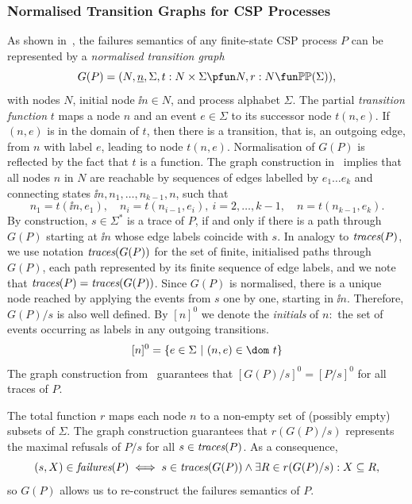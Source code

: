 \subsubsection*{Normalised Transition Graphs for CSP Processes}
\label{sec:ntg}

As shown in~\cite{Roscoe:1994:CME:197600}, the failures semantics of 
any finite-state CSP process $P$
can be represented by a \emph{normalised transition graph}
$$
G(P) = ( N, \ii n, \Sigma, t : N\times\Sigma \pfun N, r : N \fun \mathbb{P}\mathbb{P}(\Sigma)),
$$
with nodes $N$, initial node $\ii n\in N$, and process alphabet $\Sigma$. The
partial \emph{transition function} $t$ maps a node $n$ and an event
$e\in\Sigma$ to its successor node $t(n,e)$. If $(n,e)$ is in the domain of
$t$, then there is a transition, that is, an outgoing edge, from $n$ with label $e$, leading to node $t(n,e)$. Normalisation of
$G(P)$ is reflected by the fact that $t$ is a function. The graph construction
in~\cite{Roscoe:1994:CME:197600} implies that all nodes $n$ in $N$ are reachable by
sequences of edges labelled by $e_1\dots e_k$ and connecting states
$\ii n,n_1,\dots,n_{k-1},n$, such that
\[
n_1 = t(\ii n,e_1), \quad n_i = t(n_{i-1},e_i),\ i = 2,\dots,k-1,\quad
n= t(n_{k-1},e_k).
\]
%
By construction, $s\in\Sigma^*$ is a trace of $P$, if and only if 
there is a path through $G(P)$ starting  at $\ii n$ whose edge labels
coincide with $s$. In analogy to $\text{\it traces}(P)$, we use
notation $\text{\it traces}(G(P))$ for the set of finite, initialised paths
through $G(P)$, each path represented by its finite sequence of edge labels, and we
note that $\text{\it traces}(P) = \text{\it traces}(G(P))$. 
Since $G(P)$ is normalised, there is a unique node
reached by applying the events from $s$ one by one, starting in $\ii n$.
Therefore, $G(P)/s$  is also well defined. By $[n]^0$ we denote the
\emph{initials} of $n$:~the set of events occurring as labels in any outgoing
transitions.
$$
[n]^0 = \{ e\in\Sigma~|~(n,e)\in\dom~t \}
$$
The graph construction from~\cite{Roscoe:1994:CME:197600} guarantees that
$[G(P)/s]^0 = [P/s]^0$ for all traces of $P$.

 

The total function $r$ maps each node $n$ to a non-empty set of  (possibly empty) subsets of $\Sigma$. 
The graph construction guarantees that $r(G(P)/s)$ represents the maximal refusals
of $P/s$ for all 
$s\in\text{\it traces}(P)$. As a consequence,  
\begin{equation}\label{eq:refsAndR}
(s,X)\in\text{\it failures}(P) \iff s\in\text{\it traces}(G(P)) \wedge \exists R\in r(G(P)/s): X\subseteq R,
\end{equation}
so $G(P)$ allows us to re-construct the failures semantics of $P$.


